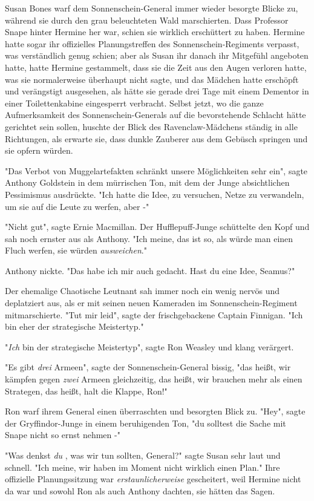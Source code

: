 {Susan Bones warf dem Sonnenschein-General immer wieder besorgte Blicke zu, während sie durch den grau beleuchteten Wald marschierten. Dass Professor Snape hinter Hermine her war, schien sie wirklich erschüttert zu haben. Hermine hatte sogar ihr offizielles Planungstreffen des Sonnenschein-Regiments verpasst, was verständlich genug schien; aber als Susan ihr danach ihr Mitgefühl angeboten hatte, hatte Hermine gestammelt, dass sie die Zeit aus den Augen verloren hatte, was sie normalerweise überhaupt nicht sagte, und das Mädchen hatte erschöpft und verängstigt ausgesehen, als hätte sie gerade drei Tage mit einem Dementor in einer Toilettenkabine eingesperrt verbracht. Selbst jetzt, wo die ganze Aufmerksamkeit des Sonnenschein-Generals auf die bevorstehende Schlacht hätte gerichtet sein sollen, huschte der Blick des Ravenclaw-Mädchens ständig in alle Richtungen, als erwarte sie, dass dunkle Zauberer aus dem Gebüsch springen und sie opfern würden.

"Das Verbot von Muggelartefakten schränkt unsere Möglichkeiten sehr ein", sagte Anthony Goldstein in dem mürrischen Ton, mit dem der Junge absichtlichen Pessimismus ausdrückte. "Ich hatte die Idee, zu versuchen, Netze zu verwandeln, um sie auf die Leute zu werfen, aber -"

"Nicht gut", sagte Ernie Macmillan. Der Hufflepuff-Junge schüttelte den Kopf und sah noch ernster aus als Anthony. "Ich meine, das ist so, als würde man einen Fluch werfen, sie würden \emph{ausweichen}."

Anthony nickte. "Das habe ich mir auch gedacht. Hast du eine Idee, Seamus?"

Der ehemalige Chaotische Leutnant sah immer noch ein wenig nervös und deplatziert aus, als er mit seinen neuen Kameraden im Sonnenschein-Regiment mitmarschierte. "Tut mir leid", sagte der frischgebackene Captain Finnigan. "Ich bin eher der strategische Meistertyp."

"\emph{Ich} bin der strategische Meistertyp", sagte Ron Weasley und klang verärgert.

"Es gibt \emph{drei} Armeen", sagte der Sonnenschein-General bissig, "das heißt, wir kämpfen gegen \emph{zwei} Armeen gleichzeitig, das heißt, wir brauchen mehr als einen Strategen, das heißt, halt die Klappe, Ron!"

Ron warf ihrem General einen überraschten und besorgten Blick zu. "Hey", sagte der Gryffindor-Junge in einem beruhigenden Ton, "du solltest die Sache mit Snape nicht so ernst nehmen -"

"Was denkst \emph{du} , was wir tun sollten, General?" sagte Susan sehr laut und schnell. "Ich meine, wir haben im Moment nicht wirklich einen Plan." Ihre offizielle Planungssitzung war \emph{erstaunlicherweise} gescheitert, weil Hermine nicht da war und sowohl Ron als auch Anthony dachten, sie hätten das Sagen.

}
